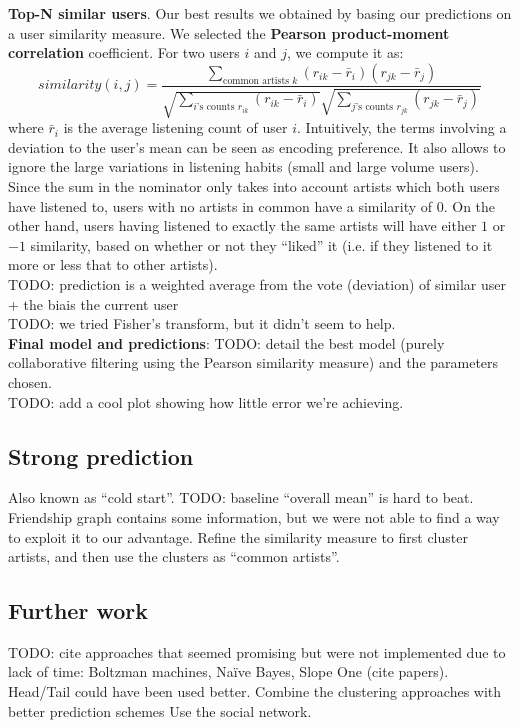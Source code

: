 \documentclass[10pt,a4paper]{article}
\begin{document}
    \noindent
    \textbf{Top-N similar users}. Our best results we obtained by basing our predictions on a user similarity measure. We selected the \textbf{Pearson product-moment correlation} coefficient. For two users $i$ and $j$, we compute it as:
    \[
      similarity(i, j) = \frac{
        \sum_{\text{common artists~} k} (r_{ik} - \bar r_{i})(r_{jk} - \bar r_{j})
      }{
        \sqrt{ \sum_{i\text{'s counts } r_{ik}} (r_{ik} - \bar r_{i}) }
        \sqrt{ \sum_{j\text{'s counts } r_{jk}} (r_{jk} - \bar r_{j}) }
      }
    \]
    where $\bar r_i$ is the average listening count of user $i$. Intuitively, the terms involving a deviation to the user's mean can be seen as encoding preference. It also allows to ignore the large variations in listening habits (small and large volume users). Since the sum in the nominator only takes into account artists which both users have listened to, users with no artists in common have a similarity of $0$. On the other hand, users having listened to exactly the same artists will have either $1$ or $-1$ similarity, based on whether or not they ``liked'' it (i.e. if they listened to it more or less that to other artists).\\

    TODO: prediction is a weighted average from the vote (deviation) of similar user + the biais the current user\\
    TODO: we tried Fisher's transform, but it didn't seem to help.\\

    \noindent
    \textbf{Final model and predictions}:
    TODO: detail the best model (purely collaborative filtering using the Pearson similarity measure) and the parameters chosen.\\
    TODO: add a cool plot showing how little error we're achieving.

  \subsection{Strong prediction}
  Also known as ``cold start''.
  TODO: baseline ``overall mean'' is hard to beat. Friendship graph contains some information, but we were not able to find a way to exploit it to our advantage. Refine the similarity measure to first cluster artists, and then use the clusters as ``common artists''.\\

  \subsection{Further work}
  TODO: cite approaches that seemed promising but were not implemented due to lack of time: Boltzman machines, Naïve Bayes, Slope One (cite papers). Head/Tail could have been used better. Combine the clustering approaches with better prediction schemes Use the social network.\\
\end{document}
